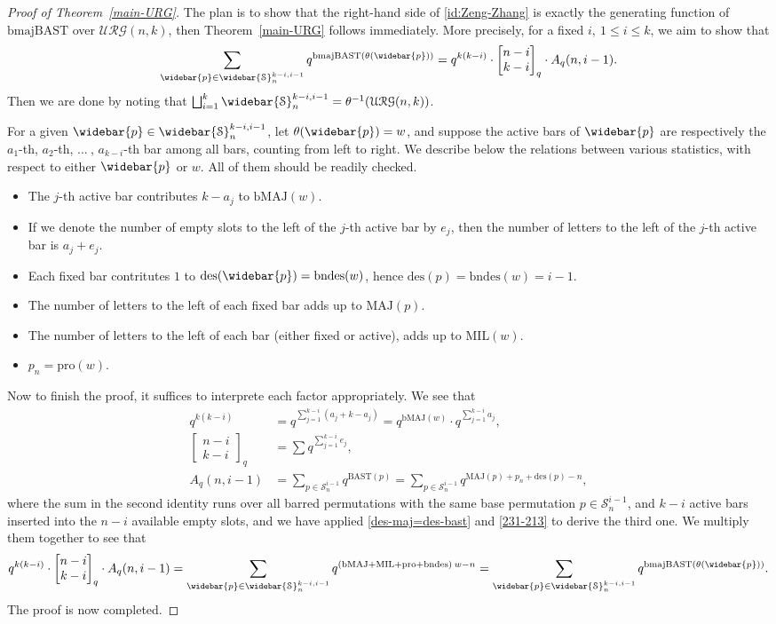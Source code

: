 \documentclass[12pt]{amsart}
\numberwithin{equation}{section}
\theoremstyle{plain}
\theoremstyle{definition}
\def\MAJ{\mathrm{MAJ}}
\def\BAST{\mathrm{BAST}}
\def\MIL{\mathrm{MIL}}
\def\des{\mathrm{des}}
\def\bMAJ{\mathrm{bMAJ}}
\def\bmajBAST{\mathrm{bmajBAST}}
\def\bndes{\mathrm{bndes}}
\def\pl{\mathrm{pro}}
\def\SS{\mathcal{S}}
\def\URG{\mathcal{URG}}
\newcommand\qbin[3]{\left[\begin{matrix} #1 \\ #2 \end{matrix} \right]_{#3}}
\begin{document}
\begin{proof}[Proof of Theorem~\ref{main-URG}]
The plan is to show that the right-hand side of \eqref{id:Zeng-Zhang} is exactly the generating function of $\bmajBAST$ over $\URG(n,k)$, then Theorem~\ref{main-URG} follows immediately. More precisely, for a fixed $i,~1\le i\le k$, we aim to show that
$$\sum_{\widebar{p}\in\widebar{\SS}_n^{k-i,i-1}}q^{\bmajBAST(\theta(\widebar{p}))}=q^{k(k-i)}\cdot \qbin{n-i}{k-i}{q}\cdot A_q(n,i-1).$$
Then we are done by noting that $\bigsqcup_{i=1}^k\widebar{\SS}_n^{k-i,i-1}=\theta^{-1}(\URG(n,k))$.

For a given $\widebar{p}\in\widebar{\SS}_n^{k-i,i-1}$, let $\theta(\widebar{p})=w$, and suppose the active bars of $\widebar{p}$ are respectively the $a_1$-th, $a_2$-th, $\ldots~$, $a_{k-i}$-th bar among all bars, counting from left to right. We describe below the relations between various statistics, with respect to either $\widebar{p}$ or $w$. All of them should be readily checked.
\begin{itemize}
	\item The $j$-th active bar contributes $k-a_j$ to $\bMAJ(w)$.
	\item If we denote the number of empty slots to the left of the $j$-th active bar by $e_j$, then the number of letters to the left of the $j$-th active bar is $a_j+e_j$.
	\item Each fixed bar contritutes $1$ to $\des(\widebar{p})=\bndes(w)$, hence $\des(p)=\bndes(w)=i-1$.
	\item The number of letters to the left of each fixed bar adds up to $\MAJ(p)$.
	\item The number of letters to the left of each bar (either fixed or active), adds up to $\MIL(w)$.
	\item $p_n=\pl(w)$.
\end{itemize}

Now to finish the proof, it suffices to interprete each factor appropriately. We see that
\begin{align*}
q^{k(k-i)} &=q^{\sum_{j=1}^{k-i}(a_j+k-a_j)}=q^{\bMAJ(w)}\cdot q^{\sum_{j=1}^{k-i}a_j},\\
\qbin{n-i}{k-i}{q} &= \sum q^{\sum_{j=1}^{k-i}e_j},\\
A_q(n,i-1) &=\sum_{p\in\SS_n^{i-1}}q^{\BAST(p)}=\sum_{p\in\SS_n^{i-1}}q^{\MAJ(p)+p_n+\des(p)-n},
\end{align*}
where the sum in the second identity runs over all barred permutations with the same base permutation $p\in\SS_n^{i-1}$, and $k-i$ active bars inserted into the $n-i$ available empty slots, and we have applied \eqref{des-maj=des-bast} and \eqref{231-213} to derive the third one. We multiply them together to see that
$$q^{k(k-i)}\cdot \qbin{n-i}{k-i}{q}\cdot A_q(n,i-1)=\sum_{\widebar{p}\in\widebar{\SS}_n^{k-i,i-1}}q^{(\bMAJ+\MIL+\pl+\bndes)\:w-n}=\sum_{\widebar{p}\in\widebar{\SS}_n^{k-i,i-1}}q^{\bmajBAST(\theta(\widebar{p}))}.$$
The proof is now completed.
\end{proof}
\end{document}
